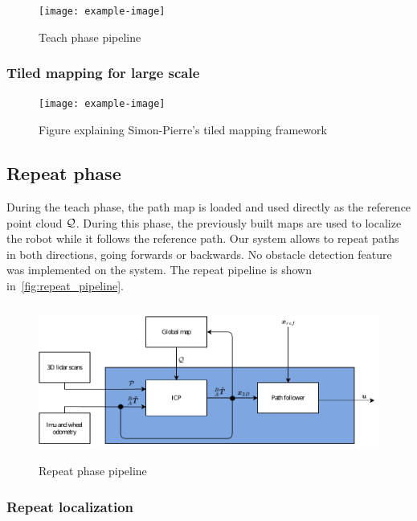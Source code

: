 \begin{figure} [htpb]
	\centering
	\texttt{[image: example-image]}
	\caption{Teach phase pipeline}
	\label{fig:teach_pipeline}
\end{figure}

\subsubsection{Tiled mapping for large scale}
\label{sec:tiled_map}
\lightlipsum[1]

\begin{figure} [htpb]
	\centering
	\texttt{[image: example-image]}
	\caption{Figure explaining Simon-Pierre's tiled mapping framework}
	\label{fig:tiled_map}
\end{figure}

\subsection{Repeat phase}
\label{sec:repeat_phase}

During the teach phase, the path map is loaded and used directly as the reference point cloud $\mathcal{Q}$.
During this phase, the previously built maps are used to localize the robot while it follows the reference path.
Our system allows to repeat paths in both directions, going forwards or backwards. 
No obstacle detection feature was implemented on the system.
The repeat pipeline is shown in~\autoref{fig:repeat_pipeline}.

\begin{figure} [htpb]
	\centering
	\includegraphics[height=2.0in]{figs/repeat_pipeline.pdf}
	\caption{Repeat phase pipeline}
	\label{fig:repeat_pipeline}
\end{figure}

\subsubsection{Repeat localization}
\label{sec:rep_loc}

